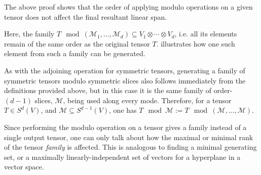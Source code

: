 \documentclass[../Lael_John_MasterThesis_Draft.tex]{subfiles}
\begin{document}
The above proof shows that the order of applying modulo operations on a given tensor does not affect the final resultant linear span.
\begin{observation}
    Here, the family $T\mod(\mathcal{M}_1, \ldots, \mathcal{M}_d) \subseteq V_1 \otimes \cdots \otimes V_d$, i.e. all its elements remain of the same order as the original tensor $T$.  illustrates how one such element from such a family can be generated.
\end{observation}
\begin{remark}
    As with the adjoining operation for symmetric tensors, generating a family of symmetric tensors modulo symmetric slices also follows immediately from the definitions provided above, but in this case it is the same family of order-$(d-1)$ slices, $\mathcal{M}$,  being used along every mode. Therefore, for a tensor $T \in S^d(V)$, and $\mathcal{M} \subseteq S^{d-1}(V)$, one has $T\mod\mathcal{M}:= T\mod(\mathcal{M}, \ldots, \mathcal{M}).$
\end{remark}
Since performing the modulo operation on a tensor gives a family instead of a single output tensor, one can only talk about how the maximal or minimal rank of the tensor \textit{family} is affected. This is analogous to finding a minimal generating set, or a maximally linearly-independent set of vectors for a hyperplane in a vector space.
\end{document}
